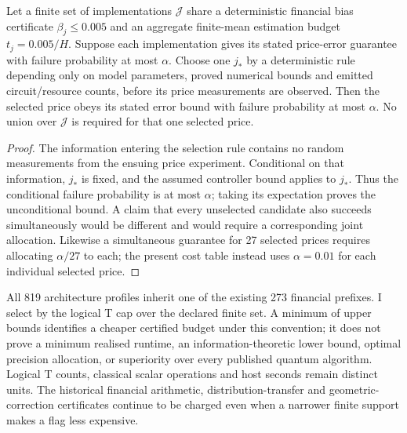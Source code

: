 \begin{proposition}
Let a finite set of implementations $\mathcal J$ share a deterministic
financial bias certificate $\beta_j\leq0.005$ and an aggregate finite-mean
estimation budget $t_j=0.005/H$. Suppose each implementation gives its stated
price-error guarantee with failure probability at most $\alpha$. Choose one
$j_*$ by a deterministic rule depending only on model parameters, proved
numerical bounds and emitted circuit/resource counts, before its price
measurements are observed. Then the selected price obeys its stated error
bound with failure probability at most $\alpha$. No union over $\mathcal J$
is required for that one selected price.
\end{proposition}
\begin{proof}
The information entering the selection rule contains no random measurements
from the ensuing price experiment. Conditional on that information, $j_*$ is
fixed, and the assumed controller bound applies to $j_*$. Thus the conditional
failure probability is at most $\alpha$; taking its expectation proves the
unconditional bound. A claim that every unselected candidate also succeeds
simultaneously would be different and would require a corresponding joint
allocation. Likewise a simultaneous guarantee for 27 selected prices requires
allocating $\alpha/27$ to each; the present cost table instead uses
$\alpha=0.01$ for each individual selected price.
\end{proof}

All 819 architecture profiles inherit one of the existing 273 financial
prefixes. I select by the logical T cap over the declared finite set. A minimum
of upper bounds identifies a cheaper certified budget under this convention;
it does not prove a minimum realised runtime, an information-theoretic lower
bound, optimal precision allocation, or superiority over every published
quantum algorithm. Logical T counts, classical scalar operations and host
seconds remain distinct units. The historical financial arithmetic,
distribution-transfer and geometric-correction certificates continue to be
charged even when a narrower finite support makes a flag less expensive.
